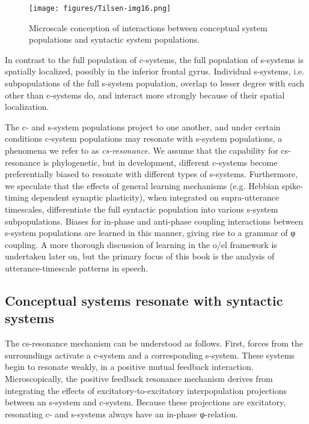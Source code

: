   
\begin{figure}
\texttt{[image: figures/Tilsen-img16.png]}
\caption{Microscale conception of interactions between conceptual system populations and syntactic system populations.}
\label{fig:2:9}
\end{figure}
 

  In contrast to the full population of c-systems, the full population of s-systems is spatially localized, possibly in the inferior frontal gyrus. Individual s-systems, i.e. subpopulations of the full s-system population, overlap to lesser degree with each other than c-systems do, and interact more strongly because of their spatial localization. 

  The c- and s-system populations project to one another, and under certain conditions c-system populations may resonate with s-system populations, a phenomena we refer to as \textit{cs-resonance}. We assume that the capability for cs-resonance is phylogenetic, but in development, different c-systems become preferentially biased to resonate with different types of s-systems. Furthermore, we speculate that the effects of general learning mechanisms (e.g. Hebbian spike-timing dependent synaptic plasticity), when integrated on supra-utterance timescales, differentiate the full syntactic population into various s-system subpopulations. Biases for in-phase and anti-phase coupling interactions between s-system populations are learned in this manner, giving rise to a grammar of φ coupling. A more thorough discussion of learning in the o/el framework is undertaken later on, but the primary focus of this book is the analysis of utterance-timescale patterns in speech.

\subsection{Conceptual systems resonate with syntactic systems}

The cs-resonance mechanism can be understood as follows. First, forces from the surroundings activate a c-system and a corresponding s-system. These systems begin to resonate weakly, in a positive mutual feedback interaction. Microscopically, the positive feedback resonance mechanism derives from integrating the effects of excitatory-to-excitatory interpopulation projections between an s-system and c-system. Because these projections are excitatory, resonating c- and s-systems always have an in-phase φ-relation. 

